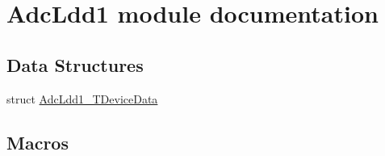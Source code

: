 \hypertarget{group___adc_ldd1__module}{}\section{Adc\+Ldd1 module documentation}
\label{group___adc_ldd1__module}
\subsection*{Data Structures}
\begin{DoxyCompactItemize}
\item 
struct \hyperlink{struct_adc_ldd1___t_device_data}{Adc\+Ldd1\+\_\+\+T\+Device\+Data}
\end{DoxyCompactItemize}
\subsection*{Macros}
